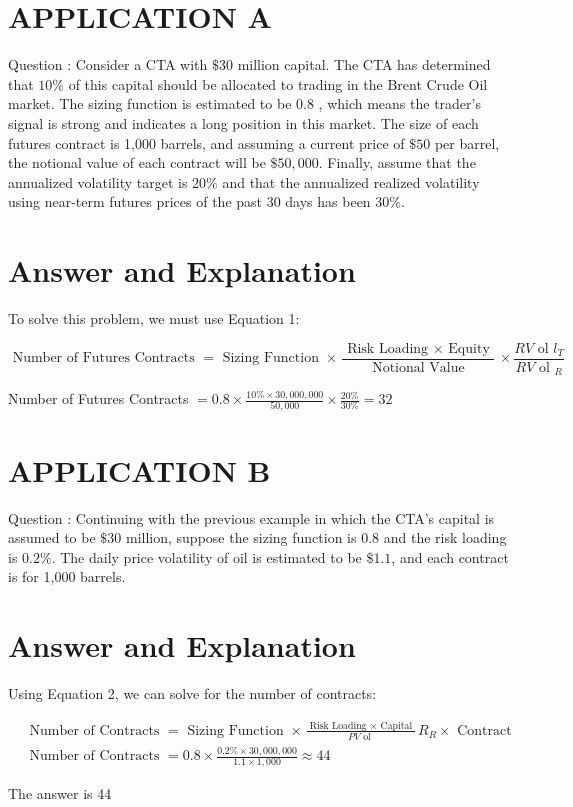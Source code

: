 \documentclass[11pt]{article}
\begin{document}
\section*{APPLICATION A}
Question : Consider a CTA with $\$ 30$ million capital. The CTA has determined that $10 \%$ of this capital should be allocated to trading in the Brent Crude Oil market. The sizing function is estimated to be 0.8 , which means the trader's signal is strong and indicates a long position in this market. The size of each futures contract is 1,000 barrels, and assuming a current price of $\$ 50$ per barrel, the notional value of each contract will be $\$ 50,000$. Finally, assume that the annualized volatility target is $20 \%$ and that the annualized realized volatility using near-term futures prices of the past 30 days has been $30 \%$.

\section*{Answer and Explanation}
To solve this problem, we must use Equation 1:

$$
\text { Number of Futures Contracts }=\text { Sizing Function } \times \frac{\text { Risk Loading } \times \text { Equity }}{\text { Notional Value }} \times \frac{R V \text { ol } l_{T}}{R V \text { ol }_{R}}
$$

Number of Futures Contracts $=0.8 \times \frac{10 \% \times 30,000,000}{50,000} \times \frac{20 \%}{30 \%}=32$

\section*{APPLICATION B}
Question : Continuing with the previous example in which the CTA's capital is assumed to be $\$ 30$ million, suppose the sizing function is 0.8 and the risk loading is $0.2 \%$. The daily price volatility of oil is estimated to be $\$ 1.1$, and each contract is for 1,000 barrels.

\section*{Answer and Explanation}
Using Equation 2, we can solve for the number of contracts:

$$
\begin{aligned}
& \text { Number of Contracts }=\text { Sizing Function } \times \frac{\text { Risk Loading } \times \text { Capital }}{P V \text { ol }} R_{R} \times \text { Contract } \\
& \text { Number of Contracts }=0.8 \times \frac{0.2 \% \times 30,000,000}{1.1 \times 1,000} \approx 44
\end{aligned}
$$

The answer is 44
\end{document}
